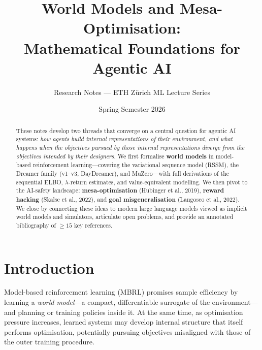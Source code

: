 \documentclass[11pt,a4paper]{article}
\title{\textbf{World Models and Mesa-Optimisation:\\
Mathematical Foundations for Agentic AI}}
\author{Research Notes --- ETH Z\"urich ML Lecture Series}
\date{Spring Semester 2026}
\theoremstyle{definition}
\begin{document}
\maketitle

\begin{abstract}
These notes develop two threads that converge on a central question for
agentic AI systems: \emph{how agents build internal representations of
their environment, and what happens when the objectives pursued by those
internal representations diverge from the objectives intended by their
designers.} We first formalise \textbf{world models} in model-based
reinforcement learning---covering the variational sequence model (RSSM),
the Dreamer family (v1--v3, DayDreamer), and MuZero---with full
derivations of the sequential ELBO, $\lambda$-return estimates, and
value-equivalent modelling. We then pivot to the AI-safety landscape:
\textbf{mesa-optimisation} (Hubinger et al., 2019), \textbf{reward
hacking} (Skalse et al., 2022), and \textbf{goal misgeneralisation}
(Langosco et al., 2022). We close by connecting these ideas to modern
large language models viewed as implicit world models and simulators,
articulate open problems, and provide an annotated bibliography of
$\geq 15$ key references.
\end{abstract}

\tableofcontents
\newpage

\section{Introduction}\label{sec:intro}

Model-based reinforcement learning (MBRL) promises sample efficiency by
learning a \emph{world model}---a compact, differentiable surrogate of
the environment---and planning or training policies inside it. At the
same time, as optimisation pressure increases, learned systems may
develop internal structure that itself performs optimisation, potentially
pursuing objectives misaligned with those of the outer training
procedure.
\end{document}
